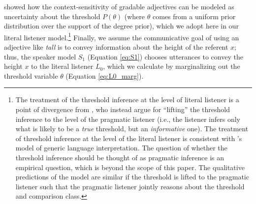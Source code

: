 \documentclass[doc]{apa6}
\newcommand{\red}[1]{\textcolor{Red}{#1}}
\begin{document}
 showed how the context-sensitivity of gradable adjectives can be modeled as uncertainty about the threshold $P(\theta)$ (where $\theta$ comes from a uniform prior distribution over the support of the degree prior), which we adopt here in our literal listener model.\footnote{
	The treatment of the threshold inference at the level of literal listener is a point of divergence from , who instead argue for ``lifting'' the threshold inference to the level of the pragmatic listener (i.e., the listener infers only what is likely to be a \emph{true} threshold, but an \emph{informative} one). The treatment of threshold inference at the level of the literal listener is consistent with 's model of generic language interpretation. 
	The question of whether the threshold inference should be thought of as pragmatic inference is an empirical question, which is beyond the scope of this paper.  The qualitative predictions of the model are similar if the threshold is lifted to the pragmatic listener such that the pragmatic listener jointly reasons about the threshold and comparison class.
}
Finally, we assume the communicative goal of using an adjective like \emph{tall} is to convey information about the height of the referent $x$; thus, the speaker model $S_1$ (Equation \ref{eq:S1}) chooses utterances to convey the height $x$ to the literal listener $L_0$, which we calculate by marginalizing out the threshold variable $\theta$ (Equation \ref{eq:L0_marg}).
  
\end{document}
